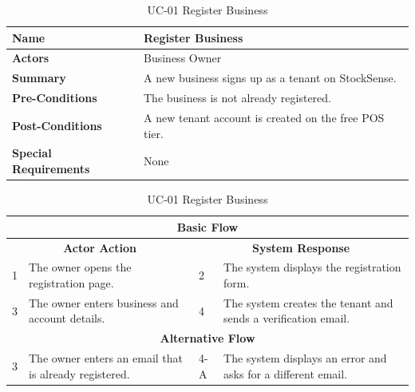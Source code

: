 \documentclass{StockSense}
\begin{document}
\begin{table}[!htbp]
\centering
\caption{UC-01 Register Business}
{\small\linespread{1}\selectfont
\begin{tabular}{|p{}|p{}|}
\hline
\textbf{Name} & Register Business \\ \hline
\textbf{Actors} & Business Owner \\ \hline
\textbf{Summary} & A new business signs up as a tenant on StockSense. \\ \hline
\textbf{Pre-Conditions} & The business is not already registered. \\ \hline
\textbf{Post-Conditions} & A new tenant account is created on the free POS tier. \\ \hline
\textbf{Special Requirements} & None \\ \hline
\end{tabular}\par\nointerlineskip
\begin{tabular}{|p{}|p{}|p{}|p{}|}
\multicolumn{4}{|c|}{\textbf{Basic Flow}} \\ \hline
\multicolumn{2}{|c|}{\textbf{Actor Action}} & \multicolumn{2}{c|}{\textbf{System Response}} \\ \hline
1 & The owner opens the registration page. & 2 & The system displays the registration form. \\ \hline
3 & The owner enters business and account details. & 4 & The system creates the tenant and sends a verification email. \\ \hline
\multicolumn{4}{|c|}{\textbf{Alternative Flow}} \\ \hline
3 & The owner enters an email that is already registered. & 4-A & The system displays an error and asks for a different email. \\ \hline
\end{tabular}\par}
\end{table}
\end{document}
